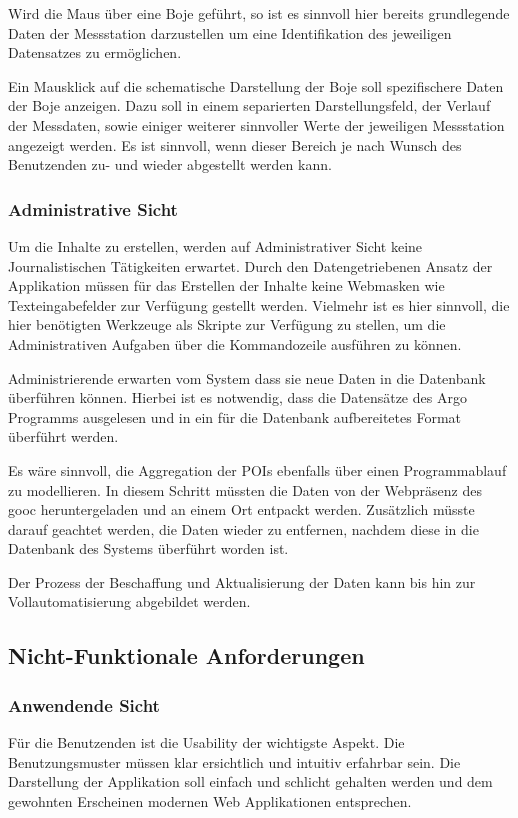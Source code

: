     Wird die Maus über eine Boje geführt, so ist es sinnvoll hier bereits grundlegende Daten der Messstation darzustellen um eine Identifikation des jeweiligen Datensatzes zu ermöglichen.
    
    Ein Mausklick auf die schematische Darstellung der Boje soll spezifischere Daten der Boje anzeigen. Dazu soll in einem separierten Darstellungsfeld, der Verlauf der Messdaten, sowie einiger weiterer sinnvoller Werte der jeweiligen Messstation angezeigt werden. Es ist sinnvoll, wenn dieser Bereich je nach Wunsch des Benutzenden zu- und wieder abgestellt werden kann. 
    
    
    \subsubsection{Administrative Sicht}
    
    Um die Inhalte zu erstellen, werden auf Administrativer Sicht keine Journalistischen Tätigkeiten erwartet. Durch den Datengetriebenen Ansatz der Applikation müssen für das Erstellen der Inhalte keine Webmasken wie Texteingabefelder zur Verfügung gestellt werden. Vielmehr ist es hier sinnvoll, die hier benötigten Werkzeuge als Skripte zur Verfügung zu stellen, um die Administrativen Aufgaben über die Kommandozeile ausführen zu können. 
    
    Administrierende erwarten vom System dass sie neue Daten  in die Datenbank überführen können. Hierbei ist es notwendig, dass die Datensätze des Argo Programms ausgelesen und in ein für die Datenbank aufbereitetes Format überführt werden. 
    
    Es wäre sinnvoll, die Aggregation der POIs ebenfalls über einen Programmablauf zu modellieren.  In diesem Schritt müssten die Daten von der Webpräsenz des gooc heruntergeladen und an einem Ort entpackt werden. Zusätzlich müsste darauf geachtet werden, die Daten wieder zu entfernen, nachdem diese in die Datenbank des Systems überführt worden ist.
    
    Der Prozess der Beschaffung und Aktualisierung der Daten kann bis hin zur Vollautomatisierung abgebildet werden. 
    



\subsection{Nicht-Funktionale Anforderungen}
    
    \subsubsection{Anwendende Sicht}
        Für die Benutzenden ist die Usability der wichtigste Aspekt. Die Benutzungsmuster müssen klar ersichtlich und intuitiv erfahrbar sein. Die Darstellung der Applikation soll einfach und schlicht gehalten werden und dem gewohnten Erscheinen modernen Web Applikationen entsprechen. 
        
